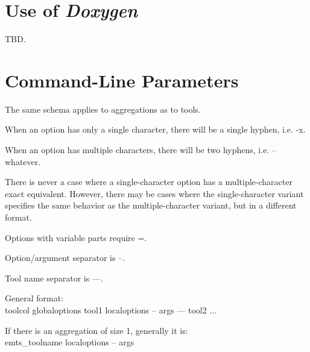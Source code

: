\section{Use of \emph{Doxygen}}
\label{ccdi2:sudo0}

TBD.


\section{Command-Line Parameters}
\label{ccdi2:sclp0}

The same schema applies to aggregations as to tools.

When an option has only a single character, there will be a single hyphen, i.e.
-x.

When an option has multiple characters, there will be two hyphens, i.e. --whatever.

There is never a case where a single-character option has a multiple-character
exact equivalent.  However, there may be cases where the single-character variant
specifies the same behavior as the multiple-character variant, but in a different
format.

Options with variable parts require =.

Option/argument separator is --.

Tool name separator is ---.

General format:\\
toolcol globaloptions tool1 localoptions -- args --- tool2 ...

If there is an aggregation of size 1, generally it is:\\
emts\_toolname localoptions -- args



